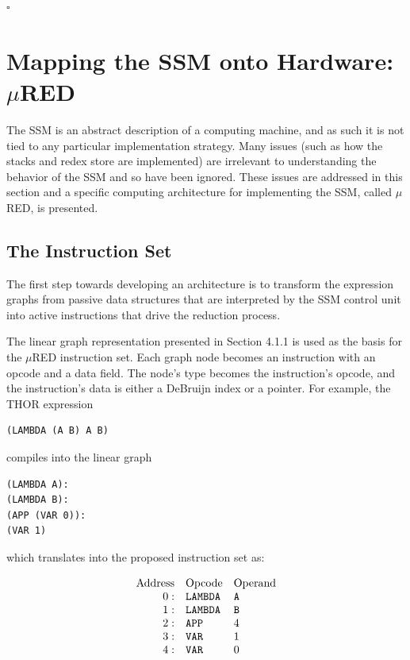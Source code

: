 \noindent\(\square\)

\section{Mapping the SSM onto Hardware: \(\mu\)RED}

The SSM is an abstract description of a computing machine, and as such it is not tied to any particular implementation strategy. Many issues (such as how the stacks and redex store are implemented) are irrelevant to understanding the behavior of the SSM and so have been ignored. These issues are addressed in this section and a specific computing architecture for implementing the SSM, called \(\mu\)RED, is presented.

\subsection{The Instruction Set}

The first step towards developing an architecture is to transform the expression graphs from passive data structures that are interpreted by the SSM control unit into active instructions that drive the reduction process.

The linear graph representation presented in Section 4.1.1 is used as the basis for the \(\mu\)RED instruction set. Each graph node becomes an instruction with an opcode and a data field. The node's type becomes the instruction's opcode, and the instruction's data is either a DeBruijn index or a pointer. For example, the THOR expression

\begin{verbatim}
(LAMBDA (A B) A B)
\end{verbatim}

compiles into the linear graph


\begin{verbatim}
(LAMBDA A):
(LAMBDA B):
(APP (VAR 0)):
(VAR 1)
\end{verbatim}

which translates into the proposed instruction set as:

\[
\begin{array}{rll}
\text{Address} & \text{Opcode} & \text{Operand}\\
0: & \texttt{LAMBDA} & \texttt{A}\\
1: & \texttt{LAMBDA} & \texttt{B}\\
2: & \texttt{APP} & 4\\
3: & \texttt{VAR} & 1\\
4: & \texttt{VAR} & 0
\end{array}
\]

